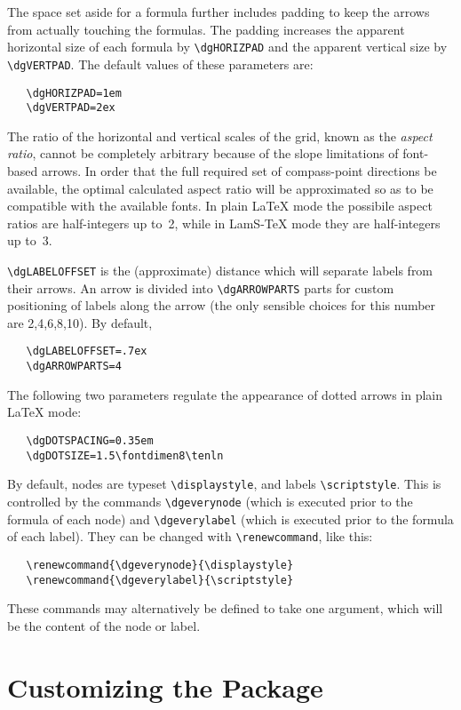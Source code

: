 \documentclass[12pt]{article}\usepackage{pb-diagram}
\begin{document}
The space set aside for a formula
further includes padding to keep the arrows from actually touching the
formulas.  The padding increases the apparent horizontal size of
each formula by \verb"\dgHORIZPAD" and the apparent vertical size
by \verb"\dgVERTPAD". The default values of these parameters are:
\begin{verbatim}
   \dgHORIZPAD=1em
   \dgVERTPAD=2ex
\end{verbatim}

The ratio of the horizontal and vertical scales of the grid,
known as the {\em aspect ratio\/}, cannot be completely
arbitrary because of the slope limitations of font-based arrows.
In order that the full required set of compass-point directions be
available, the optimal calculated aspect ratio will be approximated
so as to be compatible with the available fonts.  In plain
\LaTeX{} mode the possibile aspect ratios are half-integers up to~2,
while in {\sc LamS}-\TeX{} mode they are half-integers up to~3.

\verb"\dgLABELOFFSET" is the (approximate) distance which will 
separate labels from their arrows.  An arrow is divided into 
\verb"\dgARROWPARTS" parts for custom positioning of labels along the 
arrow (the only sensible choices for this number are 2,4,6,8,10).  By 
default,
\begin{verbatim}
   \dgLABELOFFSET=.7ex
   \dgARROWPARTS=4
\end{verbatim}

The following two parameters regulate the appearance of dotted arrows 
in plain \LaTeX{} mode:
\begin{verbatim}
   \dgDOTSPACING=0.35em
   \dgDOTSIZE=1.5\fontdimen8\tenln
\end{verbatim}

By default, nodes are typeset \verb"\displaystyle", and labels
\verb"\scriptstyle".  This is controlled by the commands 
\verb"\dgeverynode" (which is executed prior to the formula of each 
node) and \verb"\dgeverylabel" (which is executed prior to the 
formula of each label).  They can be changed with 
\verb"\renewcommand", like this:
\begin{verbatim}
   \renewcommand{\dgeverynode}{\displaystyle}
   \renewcommand{\dgeverylabel}{\scriptstyle}
\end{verbatim}
These commands may alternatively be defined to take one argument,
which will be the content of the node or label.


\section{Customizing the Package}
\end{document}
